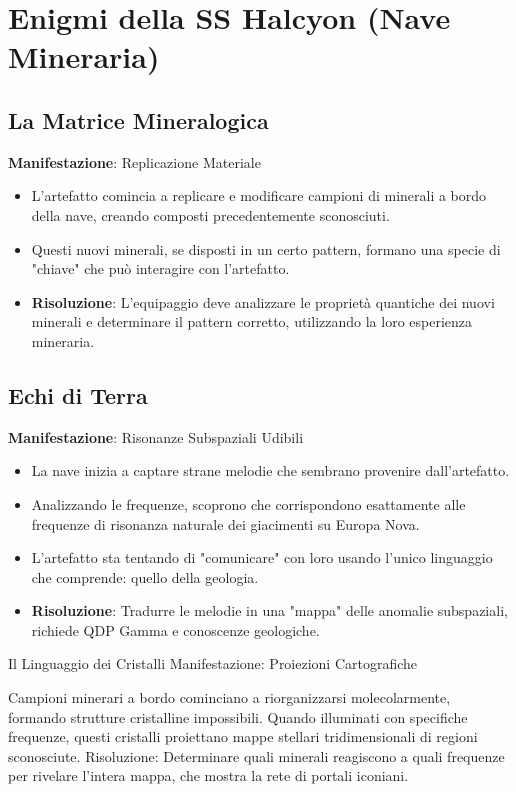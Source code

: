 \documentclass[letterpaper,twocolumn,openany,nodeprecatedcode]{dndbook}
\begin{document}
\section{Enigmi della SS Halcyon (Nave Mineraria)}
\subsection{La Matrice Mineralogica}
\textbf{Manifestazione}: Replicazione Materiale

\begin{itemize}
    \item L'artefatto comincia a replicare e modificare campioni di minerali a bordo della nave, creando composti precedentemente sconosciuti.
    \item Questi nuovi minerali, se disposti in un certo pattern, formano una specie di "chiave" che può interagire con l'artefatto.
    \item \textbf{Risoluzione}: L'equipaggio deve analizzare le proprietà quantiche dei nuovi minerali e determinare il pattern corretto, utilizzando la loro esperienza mineraria.
\end{itemize}

\subsection{Echi di Terra}
\textbf{Manifestazione}: Risonanze Subspaziali Udibili

\begin{itemize}
    \item La nave inizia a captare strane melodie che sembrano provenire dall'artefatto.
    \item Analizzando le frequenze, scoprono che corrispondono esattamente alle frequenze di risonanza naturale dei giacimenti su Europa Nova.
    \item L'artefatto sta tentando di "comunicare" con loro usando l'unico linguaggio che comprende: quello della geologia.
    \item \textbf{Risoluzione}: Tradurre le melodie in una "mappa" delle anomalie subspaziali, richiede QDP Gamma e conoscenze geologiche.
\end{itemize}


Il Linguaggio dei Cristalli
Manifestazione: Proiezioni Cartografiche

Campioni minerari a bordo cominciano a riorganizzarsi molecolarmente, formando strutture cristalline impossibili.
Quando illuminati con specifiche frequenze, questi cristalli proiettano mappe stellari tridimensionali di regioni sconosciute.
Risoluzione: Determinare quali minerali reagiscono a quali frequenze per rivelare l'intera mappa, che mostra la rete di portali iconiani.
\end{document}
